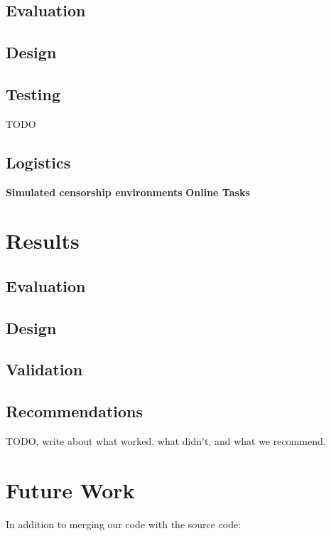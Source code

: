 \documentclass{template}
\begin{document}
\subsection{Evaluation}

\subsection{Design}

\subsection{Testing}
{\color {red} TODO}

\subsection{Logistics} 
{\bfseries Simulated censorship environments}
{\bfseries Online Tasks}

\section{Results} 

\subsection{Evaluation} 
\subsection{Design} 
\subsection{Validation} 
\subsection{Recommendations} 
TODO, write about what worked, what didn't, and what we recommend.

\section{Future Work}
In addition to merging our code with the source code: 
\end{document}
